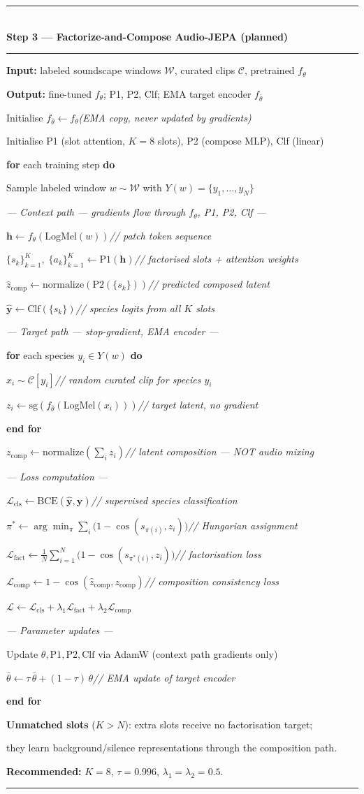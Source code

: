 \documentclass[11pt]{article}
\newcommand{\stopgrad}[1]{\mathrm{sg}\!\left(#1\right)}
\newcommand{\norm}[1]{\mathrm{normalize}\!\left(#1\right)}
\newcounter{algline}
\newenvironment{pseudo}[1]{%
  \setcounter{algline}{0}%
  \par\addvspace{6pt}%
  \noindent\rule{\linewidth}{0.8pt}\\[-2pt]%
  {\small\textbf{#1}}\\[-4pt]%
  \noindent\rule{\linewidth}{0.4pt}\par%
  \begin{list}{}{%
    \setlength{\leftmargin}{1.6em}%
    \setlength{\itemsep}{1.5pt}%
    \setlength{\parsep}{0pt}%
    \setlength{\topsep}{3pt}%
  }\small%
}{%
  \end{list}%
  \noindent\rule{\linewidth}{0.8pt}\par\addvspace{6pt}%
}
\newcommand{\lLine}[1]{%
  \item[{\makebox[1.2em][r]{\scriptsize\color{gray}\refstepcounter{algline}\thealgline}}]%
  #1}
\newcommand{\lSkip}{\item[]}
\newcommand{\lSec}[2]{\item[]\hspace*{-1.6em}\textcolor{#1}{\textit{--- #2 ---}}}
\newcommand{\lCmt}[1]{\hfill\footnotesize\color{gray}\textit{// #1}}
\begin{document}
\begin{pseudo}{Step 3 — Factorize-and-Compose Audio-JEPA (planned)}
\lLine{\textbf{Input:} labeled soundscape windows $\mathcal{W}$, curated clips $\mathcal{C}$, pretrained $f_\theta$}
\lLine{\textbf{Output:} fine-tuned $f_\theta$;\; P1, P2, Clf;\; EMA target encoder $f_{\bar\theta}$}
\lSkip
\lLine{Initialise $f_{\bar\theta}\leftarrow f_\theta$\quad\textit{(EMA copy, never updated by gradients)}}
\lLine{Initialise P1 (slot attention, $K=8$ slots),\; P2 (compose MLP),\; Clf (linear)}
\lLine{\textbf{for} each training step \textbf{do}}
\lLine{\quad Sample labeled window $w\sim\mathcal{W}$ with $Y(w)=\{y_1,\ldots,y_N\}$}
\lSkip
\lSec{cP1}{Context path — gradients flow through $f_\theta$, P1, P2, Clf}
\lLine{\quad $\mathbf{h}\leftarrow f_\theta\!\left(\mathrm{LogMel}(w)\right)$\lCmt{patch token sequence}}
\lLine{\quad $\{s_k\}_{k=1}^K,\;\{a_k\}_{k=1}^K\leftarrow\mathrm{P1}(\mathbf{h})$\lCmt{factorised slots + attention weights}}
\lLine{\quad $\hat{z}_{\mathrm{comp}}\leftarrow\norm{\mathrm{P2}\!\left(\{s_k\}\right)}$\lCmt{predicted composed latent}}
\lLine{\quad $\hat{\mathbf{y}}\leftarrow\mathrm{Clf}\!\left(\{s_k\}\right)$\lCmt{species logits from all $K$ slots}}
\lSkip
\lSec{cEt}{Target path — stop-gradient, EMA encoder}
\lLine{\quad \textbf{for} each species $y_i\in Y(w)$ \textbf{do}}
\lLine{\quad\quad $x_i\sim\mathcal{C}[y_i]$\lCmt{random curated clip for species $y_i$}}
\lLine{\quad\quad $z_i\leftarrow\stopgrad{f_{\bar\theta}\!\left(\mathrm{LogMel}(x_i)\right)}$\lCmt{target latent, no gradient}}
\lLine{\quad \textbf{end for}}
\lLine{\quad $z_{\mathrm{comp}}\leftarrow\norm{\sum_{i}z_i}$\lCmt{latent composition --- NOT audio mixing}}
\lSkip
\lSec{cCl}{Loss computation}
\lLine{\quad $\mathcal{L}_{\mathrm{cls}}\leftarrow\mathrm{BCE}(\hat{\mathbf{y}},\mathbf{y})$\lCmt{supervised species classification}}
\lLine{\quad $\pi^*\leftarrow\arg\min_{\pi}\sum_{i}\bigl(1-\cos(s_{\pi(i)},z_i)\bigr)$\lCmt{Hungarian assignment}}
\lLine{\quad $\mathcal{L}_{\mathrm{fact}}\leftarrow\tfrac{1}{N}\sum_{i=1}^{N}\bigl(1-\cos(s_{\pi^*(i)},z_i)\bigr)$\lCmt{factorisation loss}}
\lLine{\quad $\mathcal{L}_{\mathrm{comp}}\leftarrow 1-\cos(\hat{z}_{\mathrm{comp}},z_{\mathrm{comp}})$\lCmt{composition consistency loss}}
\lLine{\quad $\mathcal{L}\leftarrow\mathcal{L}_{\mathrm{cls}}+\lambda_1\mathcal{L}_{\mathrm{fact}}+\lambda_2\mathcal{L}_{\mathrm{comp}}$}
\lSkip
\lSec{cEt}{Parameter updates}
\lLine{\quad Update $\theta,\mathrm{P1},\mathrm{P2},\mathrm{Clf}$ via AdamW (context path gradients only)}
\lLine{\quad $\bar\theta\leftarrow\tau\,\bar\theta+(1-\tau)\,\theta$\lCmt{EMA update of target encoder}}
\lLine{\textbf{end for}}
\lSkip
\lLine{\textbf{Unmatched slots} ($K>N$): extra slots receive no factorisation target;}
\lLine{\quad they learn background/silence representations through the composition path.}
\lLine{\textbf{Recommended:} $K=8$,\; $\tau=0.996$,\; $\lambda_1=\lambda_2=0.5$.}
\end{pseudo}
\end{document}

